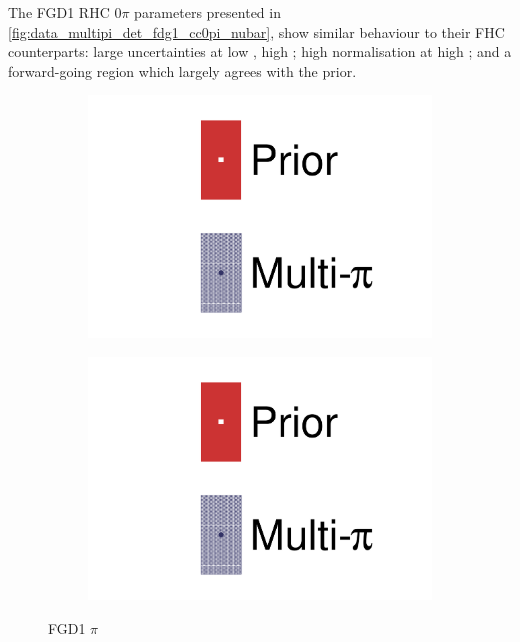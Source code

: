 The FGD1 RHC 0$\pi$ parameters presented in \autoref{fig:data_multipi_det_fdg1_cc0pi_nubar}, show similar behaviour to their FHC counterparts: large uncertainties at low \cosmu, high \pmu; high normalisation at high \pmu; and a forward-going region which largely agrees with the prior. 
\begin{figure}[h]
	\centering
	\begin{subfigure}[t]{0.32\textwidth}
		\includegraphics[width=\textwidth,page=44, trim={0mm 0mm 0mm 0mm}, clip]{figures/mach3/2018/data/2018a_FixedCov_RedCov_Mpi_Data_merge_drawPar_withDet}
	\end{subfigure}
	\begin{subfigure}[t]{0.32\textwidth}
		\includegraphics[width=\textwidth,page=45, trim={0mm 0mm 0mm 0mm}, clip]{figures/mach3/2018/data/2018a_FixedCov_RedCov_Mpi_Data_merge_drawPar_withDet}
	\end{subfigure}
	\caption{FGD1 $\pi$}
	\label{fig:data_multipi_det_fdg1_cc0pi_nubar}
\end{figure}

